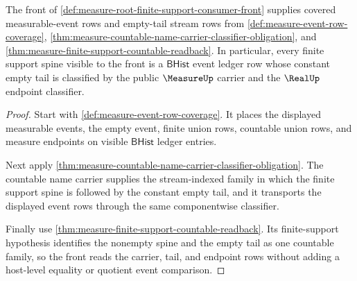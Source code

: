 \begin{theorem}
\label{thm:measure-root-finite-support-carrier-readback}
The front of \autoref{def:measure-root-finite-support-consumer-front}
supplies covered measurable-event rows and empty-tail stream rows from
\autoref{def:measure-event-row-coverage},
\autoref{thm:measure-countable-name-carrier-classifier-obligation}, and
\autoref{thm:measure-finite-support-countable-readback}. In particular, every
finite support spine visible to the front is a $\mathsf{BHist}$ event ledger
row whose constant empty tail is classified by the public $\MeasureUp$
carrier and the $\RealUp$ endpoint classifier.
\end{theorem}
\begin{proof}
Start with \autoref{def:measure-event-row-coverage}. It places the displayed
measurable events, the empty event, finite union rows, countable union rows,
and measure endpoints on visible $\mathsf{BHist}$ ledger entries.

Next apply \autoref{thm:measure-countable-name-carrier-classifier-obligation}.
The countable name carrier supplies the stream-indexed family in which the
finite support spine is followed by the constant empty tail, and it transports
the displayed event rows through the same componentwise classifier.

Finally use \autoref{thm:measure-finite-support-countable-readback}. Its
finite-support hypothesis identifies the nonempty spine and the empty tail as
one countable family, so the front reads the carrier, tail, and endpoint rows
without adding a host-level equality or quotient event comparison.
\end{proof}

